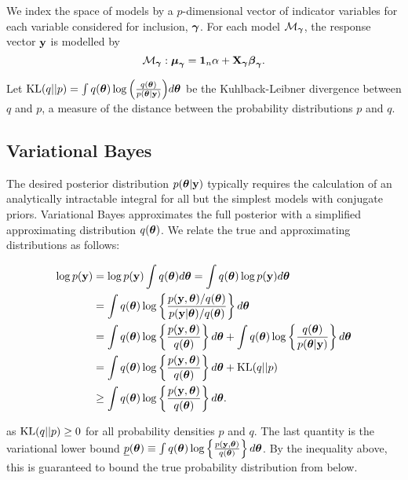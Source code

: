 \documentclass{amsart}[12pt]
\begin{document}
We index the space of models by a $p$-dimensional vector of indicator variables for each variable considered 
for inclusion, ${\boldsymbol \gamma}$. For each model $\mathcal{M}_{\boldsymbol \gamma}$, the response vector ${\bf y}$ is modelled by
\begin{equation*}
\mathcal{M}_{\boldsymbol \gamma}: {\boldsymbol \mu}_{\boldsymbol \gamma} = {\bf 1}_n \alpha + {\bf X}_{\boldsymbol \gamma} {\boldsymbol \beta}_{\boldsymbol \gamma}.
\end{equation*}

Let $\text{KL}(q||p) = \int q({\boldsymbol \theta}) \log{\left( \frac{q({\boldsymbol\theta})}{p({\boldsymbol\theta}|{\bf y})} \right)} d {\boldsymbol \theta}$ be the
Kuhlback-Leibner divergence between $q$ and $p$, a measure of the distance between the probability
distributions $p$ and $q$.

\subsection{Variational Bayes}

The desired posterior distribution $p({\boldsymbol \theta} | {\bf y})$ typically requires the calculation of an analytically
intractable integral for all but the simplest models with conjugate priors. Variational Bayes approximates
the full posterior with a simplified approximating distribution $q({\boldsymbol \theta})$. We relate the true and 
approximating distributions as follows:

\begin{align*}
\log p({\bf y}) &= \log p({\bf y}) \int q({\boldsymbol \theta}) d {\boldsymbol \theta} = \int q({\boldsymbol \theta}) \log p({\bf y}) d {\boldsymbol \theta} \\
&= \int q({\boldsymbol \theta}) \log \left\{ \frac{p({\bf y}, {\boldsymbol \theta}) / q({\boldsymbol \theta})}{p({\bf y}|{\boldsymbol \theta}) / q({\boldsymbol \theta})} \right\} d {\boldsymbol \theta} \\
&= \int q({\boldsymbol \theta}) \log\left\{ \frac{p({\bf y}, {\boldsymbol \theta})}{q({\boldsymbol \theta})} \right\} d {\boldsymbol \theta} +
		\int q({\boldsymbol \theta}) \log\left\{ \frac{q({\boldsymbol \theta})}{p({\boldsymbol \theta}|{\bf y})} \right\} d {\boldsymbol \theta} \\
&= \int q({\boldsymbol \theta}) \log\left\{ \frac{p({\bf y}, {\boldsymbol \theta})}{q({\boldsymbol \theta})} \right\} d {\boldsymbol \theta} +
		\text{KL}(q||p) \\
&\geq \int q({\boldsymbol \theta}) \log\left\{ \frac{p({\bf y}, {\boldsymbol \theta})}{q({\boldsymbol \theta})} \right\} d {\boldsymbol \theta}.
\end{align*}

as $\text{KL}(q||p) \geq 0$ for all probability densities $p$ and $q$. The last quantity is the variational lower
bound $\underline{p}({\boldsymbol \theta}) \equiv \int q({\boldsymbol \theta}) \log\left\{ \frac{p({\bf y}, {\boldsymbol \theta})}{q({\boldsymbol \theta})} \right\}
d{\boldsymbol \theta}$. By the inequality above, this is guaranteed to bound the true probability distribution from
below.
\end{document}
